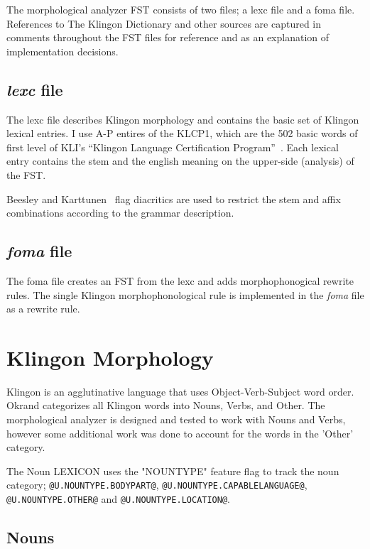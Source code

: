 \documentclass[11pt]{article}
\begin{document}
The morphological analyzer FST consists of two files; a lexc file and a foma file. References to The Klingon Dictionary and other sources are captured in comments throughout the FST files for reference and as an explanation of implementation decisions.

\subsection{\textit{lexc} file}

The lexc file describes Klingon morphology and contains the basic set of Klingon lexical entries. I use A-P entires of the KLCP1, which are the 502 basic words of first level of KLI's ``Klingon Language Certification Program''~\cite{Zrajm:12}. Each lexical entry contains the stem and the english meaning on the upper-side (analysis) of the FST.

Beesley and Karttunen~ flag diacritics are used to restrict the stem and affix combinations according to the grammar description.

\subsection{\textit{foma} file}

The foma file creates an FST from the lexc and adds morphophonogical rewrite rules. The single Klingon morphophonological rule is implemented in the \textit{foma} file as a rewrite rule.

\section{Klingon Morphology}

Klingon is an agglutinative language that uses Object-Verb-Subject word order. Okrand categorizes all Klingon words into Nouns, Verbs, and Other. The morphological analyzer is designed and tested to work with Nouns and Verbs, however some additional work was done to account for the words in the 'Other' category.

The Noun LEXICON uses the "NOUNTYPE" feature flag to track the noun category; \texttt{@U.NOUNTYPE.BODYPART@}, \texttt{@U.NOUNTYPE.CAPABLELANGUAGE@}, \texttt{@U.NOUNTYPE.OTHER@} and \texttt{@U.NOUNTYPE.LOCATION@}.

\subsection {Nouns}
\end{document}
